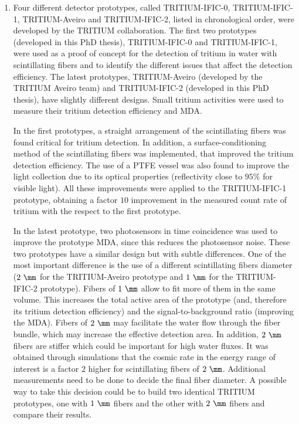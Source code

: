 \begin{enumerate}

\item{} Four different detector prototypes, called TRITIUM-IFIC-0, TRITIUM-IFIC-1, TRITIUM-Aveiro and TRITIUM-IFIC-2, listed in chronological order, were developed by the TRITIUM collaboration. The first two prototypes (developed in this PhD thesis), TRITIUM-IFIC-0 and TRITIUM-IFIC-1, were used as a proof of concept for the detection of tritium in water with scintillating fibers and to identify the different issues that affect the detection efficiency. The latest prototypes, TRITIUM-Aveiro (developed by the TRITIUM Aveiro team) and TRITIUM-IFIC-2 (developed in this PhD thesis), have slightly different designs. Small tritium activities were used to measure their tritium detection efficiency and MDA. %

In the first prototypes, a straight arrangement of the scintillating fibers was found critical for tritium detection. In addition, a surface-conditioning method of the scintillating fibers was implemented, that improved the tritium detection efficiency. The use of a PTFE vessel was also found to improve the light collection due to its optical properties (reflectivity close to $95\%$ for visible light). All these improvements were applied to the TRITIUM-IFIC-1 prototype, obtaining a factor $10$ improvement in the measured count rate of tritium with the respect to the first prototype. %

In the latest prototype, two photosensors in time coincidence was used to improve the prototype MDA, since this reduces the photosensor noise. These two prototypes have a similar design but with subtle differences. One of the most important difference is the use of a different scintillating fibers diameter ($2~\mm$ for the TRITIUM-Aveiro prototype and $1~\mm$ for the TRITIUM-IFIC-2 prototype). Fibers of $1~\mm$ allow to fit more of them in the same volume. This increases the total active area of the prototype (and, therefore its tritium detection efficiency) and the signal-to-background ratio (improving the MDA). Fibers of $2~\mm$ may facilitate the water flow through the fiber bundle, which may increase the effective detection area. In addition, $2~\mm$ fibers are stiffer which could be important for high water fluxes. It was obtained through simulations that the cosmic rate in the energy range of interest is a factor $2$ higher for scintillating fibers of $2~\mm$. Additional measurements need to be done to decide the final fiber diameter. A possible way to take this decision could be to build two identical TRITIUM prototypes, one with $1~\mm$ fibers and the other with $2~\mm$ fibers and compare their results. 


\end{enumerate}
